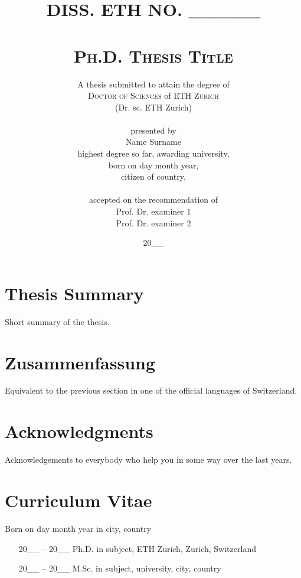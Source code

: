 \documentclass[
    12pt,
    a4paper,
    oneside %
]{book}
\title{
    \normalsize{DISS. ETH NO. \_\_\_\_\_}\\
    \Huge{\textsc{\\Ph.D. Thesis Title}}
}
\author{
    \Large{A thesis submitted to attain the degree of } \\ 
    \Large{\textsc{Doctor of Sciences} of \textsc{ETH Zurich}}\\ 
    \Large{(Dr. sc. ETH Zurich)}\\\\ 
    presented by \\ 
    Name Surname \\
    highest degree so far, awarding university, \\
    born on day month year, \\
    citizen of country, \\\\
    accepted on the recommendation of \\ 
    Prof. Dr. examiner 1 \\ 
    Prof. Dr. examiner 2\\
}
\date{
    20\_\_
}
\begin{document}
\maketitle 
\thispagestyle{empty} 
\vspace{0cm}

\chapter*{Thesis Summary} 
Short summary of the thesis.

\chapter*{Zusammenfassung} 
Equivalent to the previous section in one of the official languages of Switzerland.

\chapter*{Acknowledgments}
Acknowledgements to everybody who help you in some way over the last years.

{
\singlespacing
\setcounter{tocdepth}{1}
\tableofcontents
}

\newpage
{}\setcounter{page}{1}


\newpage
\renewcommand{\bibname}{References}



\chapter*{Curriculum Vitae}
\thispagestyle{empty}
\noindent Born on day month year in city, country
\begin{itemize}[leftmargin=6em]
    \item [20\_\_ -- 20\_\_] Ph.D. in subject, ETH Zurich, Zurich, Switzerland
    \item [20\_\_ -- 20\_\_] M.Sc. in subject, university, city, country
\end{itemize}
\end{document}
